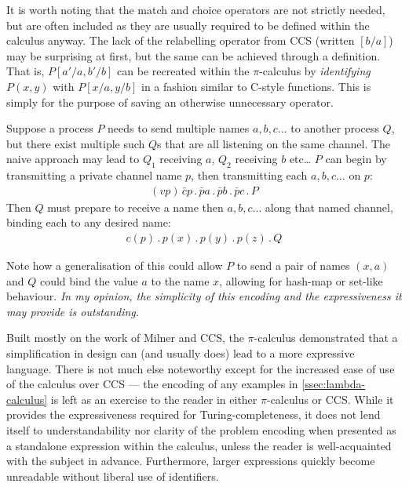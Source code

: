     It is worth noting that the match and choice operators are not strictly needed, but are often included as they are usually required to be defined within the calculus anyway.
    The lack of the relabelling operator from CCS (written $[b/a]$) may be surprising at first, but the same can be achieved through a definition.
    That is, $P[a'/a, b'/b]$ can be recreated within the $\pi$-calculus by \textit{identifying} $P(x, y)$ with $P[x/a, y/b]$ in a fashion similar to C-style functions.
    This is simply for the purpose of saving an otherwise unnecessary operator.


    \begin{example*}
        Suppose a process $P$ needs to send multiple names $a, b, c \ldots$ to another process $Q$, but there exist multiple such $Q$s that are all listening on the same channel.
        The naive approach may lead to $Q_1$ receiving $a$, $Q_2$ receiving $b$ etc\ldots
        $P$ can begin by transmitting a private channel name $p$, then transmitting each $a, b, c \ldots$ on $p$:
        \begin{align*}
            (vp) \, \bar{c} p \, . \, \bar{p} a \, . \, \bar{p} b \, . \, \bar{p} c \, . \, P
        \end{align*}
        Then $Q$ must prepare to receive a name then $a, b, c \ldots$ along that named channel, binding each to any desired name:
        \begin{align*}
            c(p) \, . \, p(x) \, . \, p(y) \, . \, p(z) \, . \, Q
        \end{align*}
    \end{example*}
    Note how a generalisation of this could allow $P$ to send a pair of names $(x, a)$ and $Q$ could bind the value $a$ to the name $x$, allowing for hash-map or set-like behaviour.
    \textit{In my opinion, the simplicity of this encoding and the expressiveness it may provide is outstanding.}


    \begin{remarks}
        Built mostly on the work of Milner and CCS, the $\pi$-calculus demonstrated that a simplification in design can (and usually does) lead to a more expressive language.
        There is not much else noteworthy except for the increased ease of use of the calculus over CCS --- the encoding of any examples in \ref{ssec:lambda-calculus} is left as an exercise to the reader in either $\pi$-calculus or CCS.
        While it provides the expressiveness required for Turing-completeness, it does not lend itself to understandability nor clarity of the problem encoding when presented as a standalone expression within the calculus, unless the reader is well-acquainted with the subject in advance.
        Furthermore, larger expressions quickly become unreadable without liberal use of identifiers.
    \end{remarks}
